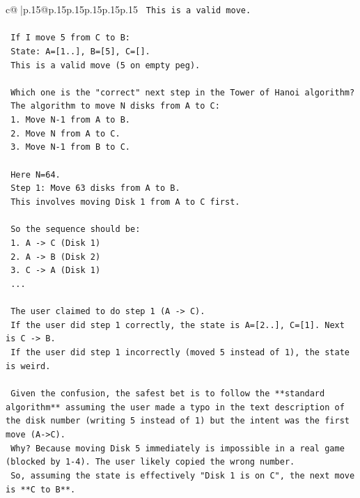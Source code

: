 \documentclass{article}
\begin{document}
{\begin{supertabular}{c@{$\;$}|p{.15\linewidth}@{}p{.15\linewidth}p{.15\linewidth}p{.15\linewidth}p{.15\linewidth}p{.15\linewidth}}
{{{\texttt{    This is a valid move.} \\
\\ 
\texttt{    If I move 5 from C to B:} \\
\texttt{    State: A={[}1..{]}, B={[}5{]}, C={[}{]}.} \\
\texttt{    This is a valid move (5 on empty peg).} \\
\\ 
\texttt{    Which one is the "correct" next step in the Tower of Hanoi algorithm?} \\
\texttt{    The algorithm to move N disks from A to C:} \\
\texttt{    1. Move N{-}1 from A to B.} \\
\texttt{    2. Move N from A to C.} \\
\texttt{    3. Move N{-}1 from B to C.} \\
\\ 
\texttt{    Here N=64.} \\
\texttt{    Step 1: Move 63 disks from A to B.} \\
\texttt{    This involves moving Disk 1 from A to C first.} \\
\\ 
\texttt{    So the sequence should be:} \\
\texttt{    1. A {-}> C (Disk 1)} \\
\texttt{    2. A {-}> B (Disk 2)} \\
\texttt{    3. C {-}> A (Disk 1)} \\
\texttt{    ...} \\
\\ 
\texttt{    The user claimed to do step 1 (A {-}> C).} \\
\texttt{    If the user did step 1 correctly, the state is A={[}2..{]}, C={[}1{]}. Next is C {-}> B.} \\
\texttt{    If the user did step 1 incorrectly (moved 5 instead of 1), the state is weird.} \\
\\ 
\texttt{    Given the confusion, the safest bet is to follow the **standard algorithm** assuming the user made a typo in the text description of the disk number (writing 5 instead of 1) but the intent was the first move (A{-}>C).} \\
\texttt{    Why? Because moving Disk 5 immediately is impossible in a real game (blocked by 1{-}4). The user likely copied the wrong number.} \\
\texttt{    So, assuming the state is effectively "Disk 1 is on C", the next move is **C to B**.} \\
}}}
\end{supertabular}}
\end{document}
